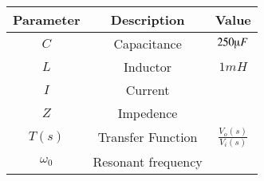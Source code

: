 \begin{tabular}{|c|c|c|}
\hline
    \textbf{Parameter} & \textbf{Description} & \textbf{Value} \\
    \hline
    $C$ & Capacitance & $250\micro F$\\
    \hline
    $L$ & Inductor & $1mH$\\
    \hline
    $I$ & Current &  \\
    \hline
    $Z$ & Impedence &  \\
    \hline
    $T(s)$ & Transfer Function & $\frac{V_o(s)}{V_i(s)}$\\
    \hline
    $\omega_0$ & Resonant frequency &  \\
    \hline
    \end{tabular}
